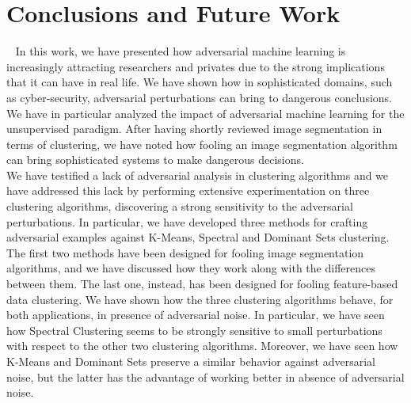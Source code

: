 \chapter{Conclusions and Future Work}~\label{conclusioni}
In this work, we have presented how adversarial machine learning is increasingly attracting researchers and privates due to the strong implications that it can have in real life. We have shown how in sophisticated domains, such as cyber-security, adversarial perturbations can bring to dangerous conclusions. We have in particular analyzed the impact of adversarial machine learning for the unsupervised paradigm. 
After having shortly reviewed image segmentation in terms of clustering, we have noted how fooling an image segmentation algorithm can bring sophisticated systems to make dangerous decisions. \\
We have testified a lack of adversarial analysis in clustering algorithms and we have addressed this lack by performing extensive experimentation on three clustering algorithms, discovering a strong sensitivity to the adversarial perturbations. In particular, we have developed three methods for crafting adversarial examples against K-Means, Spectral and Dominant Sets clustering. The first two methods have been designed for fooling image segmentation algorithms, and we have discussed how they work along with the differences between them. The last one, instead, has been designed for fooling feature-based data clustering.
We have shown how the three clustering algorithms behave, for both applications, in presence of adversarial noise. In particular, we have seen how Spectral Clustering seems to be strongly sensitive to small perturbations with respect to the other two clustering algorithms. Moreover, we have seen how K-Means and Dominant Sets preserve a similar behavior against adversarial noise, but the latter has the advantage of working better in absence of adversarial noise.\\
